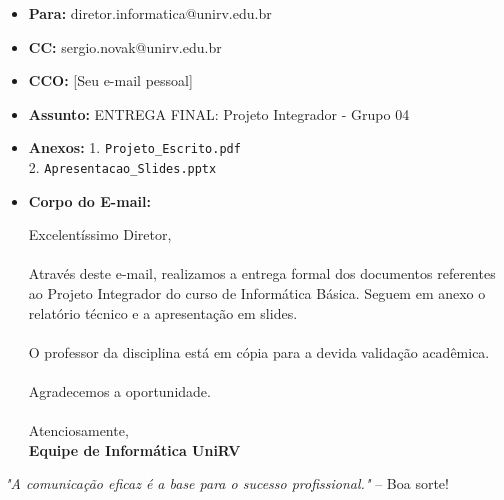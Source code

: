 \documentclass[12pt,a4paper]{article}
\begin{document}
\begin{itemize}[label=$\square$]
    \item \textbf{Para:} diretor.informatica@unirv.edu.br
    \item \textbf{CC:} sergio.novak@unirv.edu.br
    \item \textbf{CCO:} [Seu e-mail pessoal]
    \item \textbf{Assunto:} ENTREGA FINAL: Projeto Integrador - Grupo 04
    \item \textbf{Anexos:} 
        1. \texttt{Projeto\_Escrito.pdf} \\
        2. \texttt{Apresentacao\_Slides.pptx}
    \item \textbf{Corpo do E-mail:}
    \begin{tcolorbox}[colback=gray!5, colframe=gray!50]
        Excelentíssimo Diretor,\\
        \\
        Através deste e-mail, realizamos a entrega formal dos documentos referentes ao Projeto Integrador do curso de Informática Básica. Seguem em anexo o relatório técnico e a apresentação em slides.\\
        \\
        O professor da disciplina está em cópia para a devida validação acadêmica.\\
        \\
        Agradecemos a oportunidade.\\
        \\
        Atenciosamente,\\
        \textbf{Equipe de Informática UniRV}
    \end{tcolorbox}
\end{itemize}

\vspace{1cm}
\begin{center}
    \textit{"A comunicação eficaz é a base para o sucesso profissional."} -- Boa sorte!
\end{center}
\end{document}
